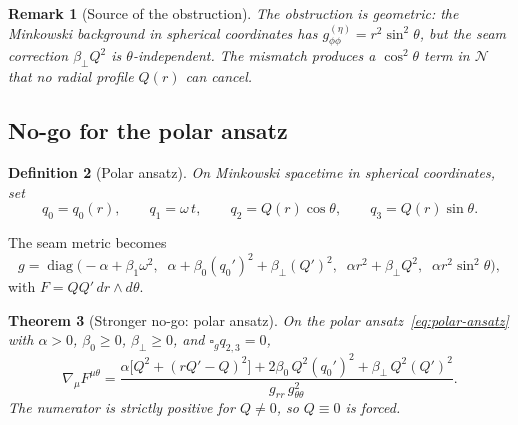 \documentclass[pdflatex,sn-mathphys-num]{sn-jnl}
\theoremstyle{thmstyleone}%
\newtheorem{theorem}{Theorem}[section]
\theoremstyle{thmstyletwo}%
\newtheorem{remark}[theorem]{Remark}
\theoremstyle{thmstylethree}%
\newtheorem{definition}[theorem]{Definition}
\newcommand{\nn}{\nabla}
\numberwithin{equation}{section}
\begin{document}
\begin{remark}[Source of the obstruction]
\label{rem:obstruction-source}
The obstruction is geometric: the Minkowski background in
spherical coordinates has $g_{\phi\phi}^{(\eta)}
= r^2\sin^2\!\theta$, but the seam correction
$\beta_\perp Q^2$ is $\theta$-independent.  The mismatch
produces a $\cos^2\!\theta$ term in $\mathcal{N}$ that no
radial profile $Q(r)$ can cancel.
\end{remark}

\subsection{No-go for the polar ansatz}

\begin{definition}[Polar ansatz]
\label{def:polar-ansatz}
On Minkowski spacetime in spherical coordinates, set
\begin{equation}
\label{eq:polar-ansatz}
q_0 = q_0(r), \qquad q_1 = \omega\,t, \qquad
q_2 = Q(r)\cos\theta, \qquad q_3 = Q(r)\sin\theta.
\end{equation}
\end{definition}

The seam metric becomes
\begin{equation}
\label{eq:polar-metric}
g = \operatorname{diag}\!\bigl(
  -\alpha+\beta_1\omega^2,\;\;
  \alpha + \beta_0(q_0')^2 + \beta_\perp(Q')^2,\;\;
  \alpha r^2 + \beta_\perp Q^2,\;\;
  \alpha r^2\sin^2\!\theta
\bigr),
\end{equation}
with $F = QQ'\,dr\wedge d\theta$.

\begin{theorem}[Stronger no-go: polar ansatz]
\label{thm:polar-nogo}
On the polar ansatz~\eqref{eq:polar-ansatz} with $\alpha > 0$,
$\beta_0\ge 0$, $\beta_\perp\ge 0$, and $\square_g q_{2,3} = 0$,
\begin{equation}
\label{eq:polar-numerator}
\nn_\mu F^{\mu\theta}
= \frac{\alpha\bigl[Q^2 + (rQ'-Q)^2\bigr]
        + 2\beta_0\,Q^2(q_0')^2
        + \beta_\perp\,Q^2(Q')^2}
       {g_{rr}\,g_{\theta\theta}^2}.
\end{equation}
The numerator is strictly positive for $Q\neq 0$, so
$Q\equiv 0$ is forced.
\end{theorem}
\end{document}
